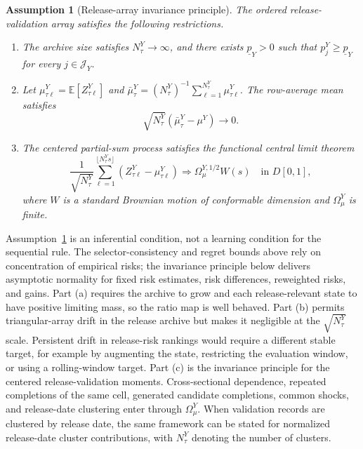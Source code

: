 \documentclass[a4paper, 12pt]{article}
\theoremstyle{plain}
\newtheorem{assumption}{Assumption}
\theoremstyle{remark}
\newcommand{\E}{\mathbb{E}}
\newcommand{\1}{\mathbf{1}}
\begin{document}
\begin{assumption}[Release-array invariance principle]
\label{ass:rt-fclt}
The ordered release-validation array satisfies the following restrictions.
\begin{enumerate}[label=(\alph*), leftmargin=*]
    \item The archive size satisfies \(N^Y_\tau\to\infty\), and there exists \(\underline p_Y>0\) such that \(p^Y_j\geq\underline p_Y\) for every \(j\in\mathcal J_Y\).
    \item Let \(\mu^Y_{\tau\ell}=\E[Z^Y_{\tau\ell}]\) and \(\bar\mu^Y_\tau=(N^Y_\tau)^{-1}\sum_{\ell=1}^{N^Y_\tau}\mu^Y_{\tau\ell}\). The row-average mean satisfies
    \begin{equation}
    \label{eq:rt-row-mean-stability}
        \sqrt{N^Y_\tau}\left(\bar\mu^Y_\tau-\mu^Y\right)\to 0 .
    \end{equation}
    \item The centered partial-sum process satisfies the functional central limit theorem
    \begin{equation}
    \label{eq:rt-fclt}
        \frac{1}{\sqrt{N^Y_\tau}}
        \sum_{\ell=1}^{\lfloor N^Y_\tau s\rfloor}
        (Z^Y_{\tau\ell}-\mu^Y_{\tau\ell})
        \Rightarrow
        \Omega^{Y,1/2}_\mu W(s)
        \quad\text{in }D[0,1],
    \end{equation}
    where \(W\) is a standard Brownian motion of conformable dimension and \(\Omega^Y_\mu\) is finite.
\end{enumerate}
\end{assumption}

Assumption~\ref{ass:rt-fclt} is an inferential condition, not a learning condition for the sequential rule. The selector-consistency and regret bounds above rely on concentration of empirical risks; the invariance principle below delivers asymptotic normality for fixed risk estimates, risk differences, reweighted risks, and gains. Part (a) requires the archive to grow and each release-relevant state to have positive limiting mass, so the ratio map is well behaved. Part (b) permits triangular-array drift in the release archive but makes it negligible at the \(\sqrt{N^Y_\tau}\) scale. Persistent drift in release-risk rankings would require a different stable target, for example by augmenting the state, restricting the evaluation window, or using a rolling-window target. Part (c) is the invariance principle for the centered release-validation moments. Cross-sectional dependence, repeated completions of the same cell, generated candidate completions, common shocks, and release-date clustering enter through \(\Omega^Y_\mu\). When validation records are clustered by release date, the same framework can be stated for normalized release-date cluster contributions, with \(N^Y_\tau\) denoting the number of clusters.
\end{document}
